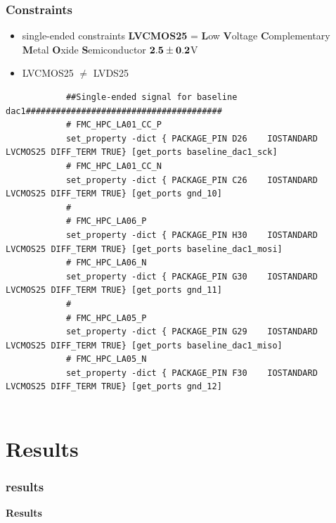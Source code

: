 \documentclass[aspectratio=169]{beamer}
\begin{document}
	\begin{frame}[fragile]
	\frametitle{Constraints}
	\begin{itemize}
		\item single-ended constraints \textbf{LVCMOS25} = \textbf{L}ow \textbf{V}oltage \textbf{C}omplementary \textbf{M}etal \textbf{O}xide \textbf{S}emiconductor $\bf{2.5 \pm 0.2}$V
		\item LVCMOS25 $\neq $ LVDS25
	\end{itemize}
	{\tiny 
		\begin{verbatim}
			##Single-ended signal for baseline dac1#######################################
			# FMC_HPC_LA01_CC_P
			set_property -dict { PACKAGE_PIN D26	IOSTANDARD LVCMOS25 DIFF_TERM TRUE}	[get_ports baseline_dac1_sck]
			# FMC_HPC_LA01_CC_N
			set_property -dict { PACKAGE_PIN C26	IOSTANDARD LVCMOS25 DIFF_TERM TRUE}	[get_ports gnd_10]
			#
			# FMC_HPC_LA06_P
			set_property -dict { PACKAGE_PIN H30	IOSTANDARD LVCMOS25 DIFF_TERM TRUE}	[get_ports baseline_dac1_mosi]
			# FMC_HPC_LA06_N
			set_property -dict { PACKAGE_PIN G30	IOSTANDARD LVCMOS25 DIFF_TERM TRUE}	[get_ports gnd_11]
			#
			# FMC_HPC_LA05_P
			set_property -dict { PACKAGE_PIN G29	IOSTANDARD LVCMOS25 DIFF_TERM TRUE}	[get_ports baseline_dac1_miso]
			# FMC_HPC_LA05_N
			set_property -dict { PACKAGE_PIN F30	IOSTANDARD LVCMOS25 DIFF_TERM TRUE}	[get_ports gnd_12]
				
		\end{verbatim} 
						}
	\end{frame}

	\section{Results}
	
	\begin{frame}
	\frametitle{results}
	\begin{center}
		{\Huge {}\selectfont \color{blue} \textbf{Results}}
	\end{center}
	\end{frame}
	
\end{document}
